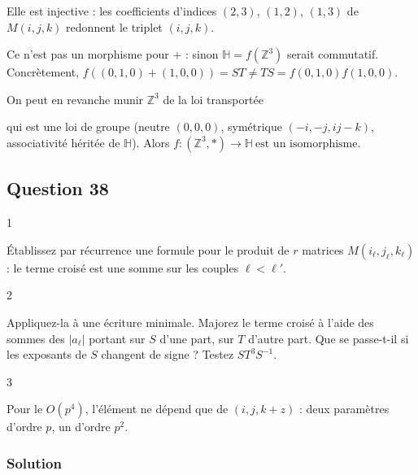 \documentclass[11pt,a4paper]{article}
\newcommand{\equationajustee}[1]{%
  \sbox{\boiteequation}{$\displaystyle #1$}%
  \ifdim\wd\boiteequation>\linewidth
    \[\resizebox{\linewidth}{!}{\usebox{\boiteequation}}\]%
  \else
    \[#1\]%
  \fi}
\begin{document}
Elle est injective : les coefficients d'indices \((2,3)\), \((1,2)\), \((1,3)\) de \(M(i,j,k)\) redonnent le triplet \((i,j,k)\).

Ce n'est pas un morphisme pour \(+\) : sinon \(\mathbb{H}=f({\mathbb{Z}}^3)\) serait commutatif. Concrètement, \(f((0,1,0)+(1,0,0))=ST\neq TS=f(0,1,0)f(1,0,0)\).

On peut en revanche munir \({\mathbb{Z}}^3\) de la loi transportée

\equationajustee{(i,j,k)*(i',j',k')=(i+i',\ j+j',\ k+k'+ji'),}

qui est une loi de groupe (neutre \((0,0,0)\), symétrique \((-i,-j,ij-k)\), associativité héritée de \(\mathbb{H}\)). Alors \(\boxed{f:({\mathbb{Z}}^3,*)\to\mathbb{H}\ \text{est un isomorphisme}}\).

\hypertarget{question-38}{%
\subsection{Question 38}\label{question-38}}

\begin{indication}{1}

Établissez par récurrence une formule pour le produit de \(r\) matrices \(M(i_\ell,j_\ell,k_\ell)\) : le terme croisé est une somme sur les couples \(\ell<\ell'\).

\end{indication}

\begin{indication}{2}

Appliquez-la à une écriture minimale. Majorez le terme croisé à l'aide des sommes des \(|a_\ell|\) portant sur \(S\) d'une part, sur \(T\) d'autre part. Que se passe-t-il si les exposants de \(S\) changent de signe ? Testez \(ST^3S^{-1}\).

\end{indication}

\begin{indication}{3}

Pour le \(O(p^4)\), l'élément ne dépend que de \((i,j,k+z)\) : deux paramètres d'ordre \(p\), un d'ordre \(p^2\).

\end{indication}

\hypertarget{solution-37}{%
\subsubsection{Solution}\label{solution-37}}
\end{document}
